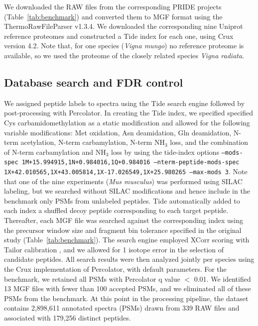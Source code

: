 \documentclass{article}
\begin{document}

We downloaded the RAW files from the corresponding PRIDE projects (Table~\ref{tab:benchmark}) and converted them to MGF format using the ThermoRawFileParser v1.3.4.
We downloaded the corresponding nine Uniprot reference proteomes and constructed a Tide index for each one, using Crux version 4.2.
Note that, for one species (\textit{Vigna mungo}) no reference proteome is available, so we used the proteome of the closely related species \textit{Vigna radiata}.

\subsection*{Database search and FDR control}

We assigned peptide labels to spectra using the Tide search engine followed by post-processing with Percolator.
In creating the Tide index, we specified specified Cys carbamidomethylation as a static modification and allowed for the following variable modifications: Met oxidation, Asn deamidation, Gln deamidation, N-term acetylation, N-term carbamylation, N-term NH$_{3}$ loss, and the combination of N-term carbamylation and NH$_{3}$ loss by using the tide-index options {\tt --mods-spec 1M+15.994915,\allowbreak 1N+0.984016,\allowbreak 1Q+0.984016 --nterm-peptide-mods-spec 1X+42.010565,\allowbreak 1X+43.005814,\allowbreak 1X-17.026549,\allowbreak 1X+25.980265 --max-mods 3}.
Note that one of the nine experiments (\textit{Mus musculus}) was performed using SILAC labeling, but we searched without SILAC modifications and hence include in the benchmark only PSMs from unlabeled peptides.
Tide automatically added to each index a shuffled decoy peptide corresponding to each target peptide.
Thereafter, each MGF file was searched against the corresponding index using the precursor window size and fragment bin tolerance specified in the original study (Table~\ref{tab:benchmark}).
The search engine employed XCorr scoring with Tailor calibration \cite{sulimov2020tailor}, and we allowed for 1 isotope error in the selection of candidate peptides.
All search results were then analyzed jointly per species using the Crux implementation of Percolator, with default parameters.
For the benchmark, we retained all PSMs with Percolator q value $<$ 0.01.
We identified 13 MGF files with fewer than 100 accepted PSMs, and we eliminated all of these PSMs from the benchmark.
At this point in the processing pipeline, the dataset contains 2,898,611 annotated spectra (PSMs)  drawn from 339 RAW files and associated with 179,256 distinct peptides.
\end{document}
